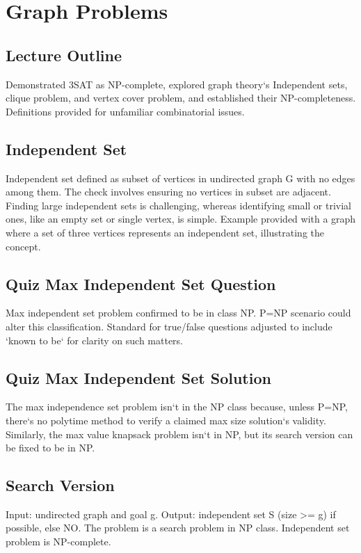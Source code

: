 \section*{Graph Problems}

\subsection*{Lecture Outline}
Demonstrated 3SAT as NP-complete, explored graph theory`s Independent sets, clique problem, and vertex cover problem, and established their NP-completeness.
Definitions provided for unfamiliar combinatorial issues.

\subsection*{Independent Set}
Independent set defined as subset of vertices in undirected graph G with no edges among them.
The check involves ensuring no vertices in subset are adjacent.
Finding large independent sets is challenging, whereas identifying small or trivial ones, like an empty set or single vertex, is simple.
Example provided with a graph where a set of three vertices represents an independent set, illustrating the concept.

\subsection*{Quiz  Max Independent Set Question}
Max independent set problem confirmed to be in class NP\@.
P=NP scenario could alter this classification.
Standard for true/false questions adjusted to include `known to be` for clarity on such matters.

\subsection*{Quiz  Max Independent Set Solution}
The max independence set problem isn`t in the NP class because, unless P=NP, there`s no polytime method to verify a claimed max size solution`s validity.
Similarly, the max value knapsack problem isn`t in NP, but its search version can be fixed to be in NP\@.

\subsection*{Search Version}
Input: undirected graph and goal g.
Output: independent set S (size \textgreater{}= g) if possible, else NO\@.
The problem is a search problem in NP class.
Independent set problem is NP-complete.

